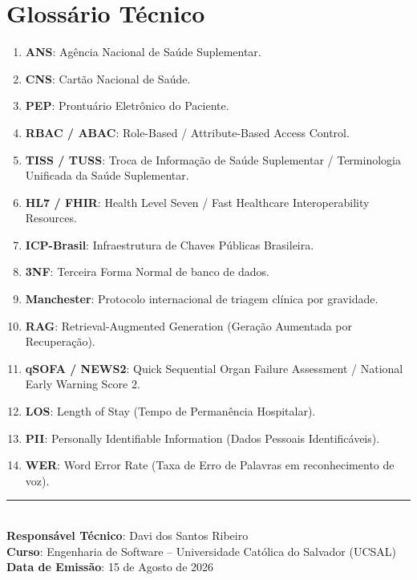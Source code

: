 \documentclass[12pt,oneside,a4paper,article]{abntex2}
\begin{document}
\section{Glossário Técnico}
\begin{enumerate}[noitemsep]
  \item \textbf{ANS}: Agência Nacional de Saúde Suplementar.
  \item \textbf{CNS}: Cartão Nacional de Saúde.
  \item \textbf{PEP}: Prontuário Eletrônico do Paciente.
  \item \textbf{RBAC / ABAC}: Role-Based / Attribute-Based Access Control.
  \item \textbf{TISS / TUSS}: Troca de Informação de Saúde Suplementar / Terminologia Unificada da Saúde Suplementar.
  \item \textbf{HL7 / FHIR}: Health Level Seven / Fast Healthcare Interoperability Resources.
  \item \textbf{ICP-Brasil}: Infraestrutura de Chaves Públicas Brasileira.
  \item \textbf{3NF}: Terceira Forma Normal de banco de dados.
  \item \textbf{Manchester}: Protocolo internacional de triagem clínica por gravidade.
  \item \textbf{RAG}: Retrieval-Augmented Generation (Geração Aumentada por Recuperação).
  \item \textbf{qSOFA / NEWS2}: Quick Sequential Organ Failure Assessment / National Early Warning Score 2.
  \item \textbf{LOS}: Length of Stay (Tempo de Permanência Hospitalar).
  \item \textbf{PII}: Personally Identifiable Information (Dados Pessoais Identificáveis).
  \item \textbf{WER}: Word Error Rate (Taxa de Erro de Palavras em reconhecimento de voz).
\end{enumerate}
\vspace{2em}
\noindent
\rule{0.6\textwidth}{0.4pt} \\
\textbf{Responsável Técnico}: Davi dos Santos Ribeiro \\
\textbf{Curso}: Engenharia de Software -- Universidade Católica do Salvador (UCSAL) \\
\textbf{Data de Emissão}: 15 de Agosto de 2026

\end{document}
